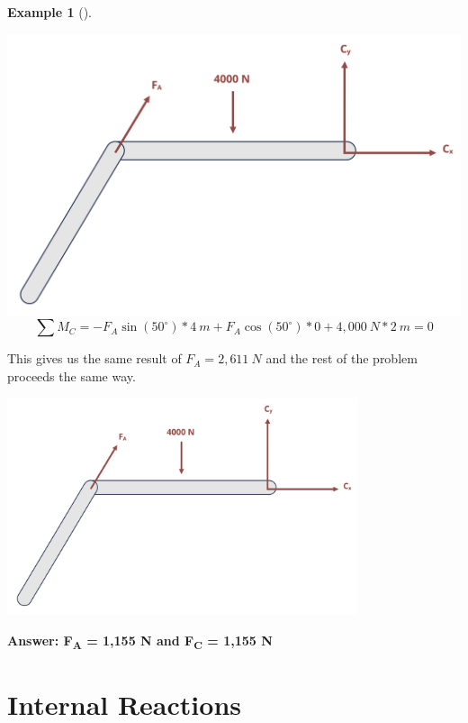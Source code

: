 \documentclass[
  letterpaper,
  DIV=11,
  numbers=noendperiod]{scrreprt}
\theoremstyle{definition}
\newtheorem{example}{Example}[chapter]
\theoremstyle{remark}
\begin{document}
\begin{tcolorbox}
\begin{example}[]
\begin{tcolorbox}
\includegraphics{images/clipboard-2163853552.png}\[
\sum M_C=-F_A \sin(50^\circ)*4{~m}+F_A \cos(50^\circ)*0+4,000{~N}*2{~m}=0
\]

This gives us the same result of \(F_A=2,611{~N}\) and the rest of the
problem proceeds the same way.

\begin{center}
\includegraphics[width=4.05208in,height=\textheight]{images/Updated CH1 examples/example 1.2 part 4.png}
\end{center}

\textbf{Answer: F\textsubscript{A} = 1,155 N and F\textsubscript{C} =
1,155 N}

\end{tcolorbox}

\end{example}

\end{tcolorbox}

\section{Internal Reactions}\label{sec-1.2}
\end{document}
